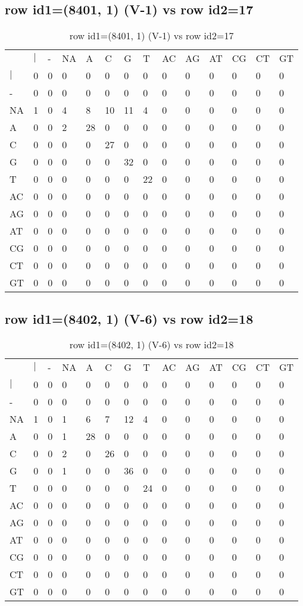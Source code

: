 \subsection{row id1=(8401, 1) (V-1) vs row id2=17}
\begin{center}
\begin{longtable}{|l|l|l|l|l|l|l|l|l|l|l|l|l|l|}
\caption{row id1=(8401, 1) (V-1) vs row id2=17} \label{table_dm664}\\
\hline
\\
\hline
&$|$&-&NA&A&C&G&T&AC&AG&AT&CG&CT&GT\\
$|$&0&0&0&0&0&0&0&0&0&0&0&0&0\\
-&0&0&0&0&0&0&0&0&0&0&0&0&0\\
NA&1&0&4&8&10&11&4&0&0&0&0&0&0\\
A&0&0&2&28&0&0&0&0&0&0&0&0&0\\
C&0&0&0&0&27&0&0&0&0&0&0&0&0\\
G&0&0&0&0&0&32&0&0&0&0&0&0&0\\
T&0&0&0&0&0&0&22&0&0&0&0&0&0\\
AC&0&0&0&0&0&0&0&0&0&0&0&0&0\\
AG&0&0&0&0&0&0&0&0&0&0&0&0&0\\
AT&0&0&0&0&0&0&0&0&0&0&0&0&0\\
CG&0&0&0&0&0&0&0&0&0&0&0&0&0\\
CT&0&0&0&0&0&0&0&0&0&0&0&0&0\\
GT&0&0&0&0&0&0&0&0&0&0&0&0&0\\
\hline
\end{longtable}
\end{center}

\subsection{row id1=(8402, 1) (V-6) vs row id2=18}
\begin{center}
\begin{longtable}{|l|l|l|l|l|l|l|l|l|l|l|l|l|l|}
\caption{row id1=(8402, 1) (V-6) vs row id2=18} \label{table_dm666}\\
\hline
\\
\hline
&$|$&-&NA&A&C&G&T&AC&AG&AT&CG&CT&GT\\
$|$&0&0&0&0&0&0&0&0&0&0&0&0&0\\
-&0&0&0&0&0&0&0&0&0&0&0&0&0\\
NA&1&0&1&6&7&12&4&0&0&0&0&0&0\\
A&0&0&1&28&0&0&0&0&0&0&0&0&0\\
C&0&0&2&0&26&0&0&0&0&0&0&0&0\\
G&0&0&1&0&0&36&0&0&0&0&0&0&0\\
T&0&0&0&0&0&0&24&0&0&0&0&0&0\\
AC&0&0&0&0&0&0&0&0&0&0&0&0&0\\
AG&0&0&0&0&0&0&0&0&0&0&0&0&0\\
AT&0&0&0&0&0&0&0&0&0&0&0&0&0\\
CG&0&0&0&0&0&0&0&0&0&0&0&0&0\\
CT&0&0&0&0&0&0&0&0&0&0&0&0&0\\
GT&0&0&0&0&0&0&0&0&0&0&0&0&0\\
\hline
\end{longtable}
\end{center}

